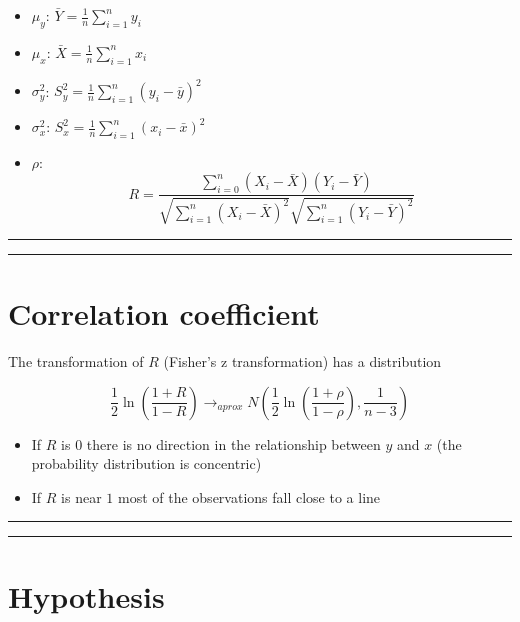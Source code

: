 \documentclass[
]{book}
\providecommand{\tightlist}{%
  \setlength{\itemsep}{0pt}\setlength{\parskip}{0pt}}
\begin{document}
\begin{itemize}
\tightlist
\item
  \(\mu_y\): \(\bar{Y}=\frac{1}{n}\sum_{i=1}^n y_i\)
\item
  \(\mu_x\): \(\bar{X}=\frac{1}{n}\sum_{i=1}^n x_i\)
\item
  \(\sigma^2_y\): \(S^2_y=\frac{1}{n}\sum_{i=1}^n (y_i-\bar{y})^2\)
\item
  \(\sigma^2_x\): \(S^2_x=\frac{1}{n}\sum_{i=1}^n (x_i-\bar{x})^2\)
\item
  \(\rho\): \[R=\frac{\sum_{i=0}^n(X_i-\bar{X})(Y_i-\bar{Y})}{\sqrt{\sum_{i=1}^n(X_i-\bar{X})^2}\sqrt{\sum_{i=1}^n(Y_i-\bar{Y})^2}}\]
\end{itemize}

\begin{center}\rule{0.5\linewidth}{0.5pt}\end{center}

\begin{center}\rule{0.5\linewidth}{0.5pt}\end{center}

\hypertarget{correlation-coefficient}{%
\section{Correlation coefficient}\label{correlation-coefficient}}

The transformation of \(R\) (Fisher's z transformation) has a distribution

\[\frac{1}{2}\ln (\frac{1+R}{1-R}) \rightarrow_{aprox} N(\frac{1}{2}\ln (\frac{1+\rho}{1-\rho}), \frac{1}{n-3})\]

\begin{itemize}
\item
  If \(R\) is \(0\) there is no direction in the relationship between \(y\) and \(x\) (the probability distribution is concentric)
\item
  If \(R\) is near \(1\) most of the observations fall close to a line
\end{itemize}

\begin{center}\rule{0.5\linewidth}{0.5pt}\end{center}

\begin{center}\rule{0.5\linewidth}{0.5pt}\end{center}

\hypertarget{hypothesis-5}{%
\section{Hypothesis}\label{hypothesis-5}}
\end{document}
